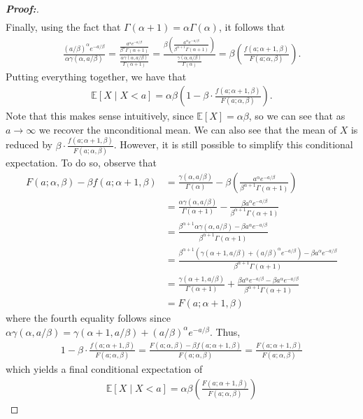 \documentclass[10pt,a4paper]{amsart}
\begin{document}
\begin{proof}[\textbf{Proof:}]
\begin{align*}
\end{align*}
Finally, using the fact that $\Gamma(\alpha + 1) = \alpha \Gamma(\alpha)$, it follows that
\begin{align*}
     \frac{(a / \beta)^\alpha e^{- a / \beta}}{\alpha \gamma(\alpha, a / \beta)} = \frac{\frac{a^\alpha e^{- a / \beta}}{\beta^\alpha \Gamma(\alpha + 1)} }{\frac{\alpha \gamma(\alpha, a / \beta)}{\Gamma(\alpha + 1)}} = \frac{\beta \left(\frac{a^\alpha e^{- a / \beta}}{\beta^{\alpha+1} \Gamma(\alpha + 1)} \right) }{\frac{\gamma(\alpha, a / \beta)}{\Gamma(\alpha)}} = \beta \left(\frac{f(a; \alpha + 1, \beta)}{F(a; \alpha, \beta)} \right).
\end{align*}
Putting everything together, we have that
\begin{align*}
    \mathbb{E}\left[X \mid X < a \right] = \alpha \beta \left(1 - \beta \cdot \frac{f(a; \alpha + 1, \beta)}{F(a; \alpha, \beta)}\right).
\end{align*}
Note that this makes sense intuitively, since $\mathbb{E}[X] = \alpha \beta$, so we can see that as $a \to \infty$ we recover the unconditional mean. We can also see that the mean of $X$ is reduced by $\beta \cdot \frac{f(a; \alpha + 1, \beta)}{F(a; \alpha, \beta)}$. However, it is still possible to simplify this conditional expectation. To do so, observe that
\begin{align*}
    F(a; \alpha, \beta) - \beta f(a ; \alpha + 1, \beta) &= \frac{\gamma(\alpha, a / \beta)}{\Gamma(\alpha)} - \beta \left(\frac{a^\alpha e^{- a / \beta}}{\beta^{\alpha+1} \Gamma(\alpha + 1)} \right) \\
    &= \frac{\alpha \gamma(\alpha, a / \beta)}{\Gamma(\alpha + 1)} - \frac{\beta a^\alpha e^{- a / \beta}}{\beta^{\alpha+1} \Gamma(\alpha + 1)} \\
    &= \frac{\beta^{\alpha + 1} \alpha \gamma(\alpha, a / \beta) - \beta a^\alpha e^{- a / \beta}}{\beta^{\alpha + 1}\Gamma(\alpha + 1)} \\
    &= \frac{\beta^{\alpha + 1} \left( \gamma(\alpha + 1, a / \beta) + (a / \beta)^\alpha e^{- a / \beta}\right) - \beta a^\alpha e^{- a / \beta}}{\beta^{\alpha + 1}\Gamma(\alpha + 1)} \\
    &= \frac{ \gamma(\alpha + 1, a / \beta)}{\Gamma(\alpha + 1)} + \frac{\beta a^\alpha e^{- a / \beta} - \beta a^\alpha e^{- a / \beta}}{\beta^{\alpha + 1}\Gamma(\alpha + 1)} \\
    &= F(a; \alpha + 1, \beta)
\end{align*}
where the fourth equality follows since $\alpha \gamma( \alpha, a / \beta) = \gamma(\alpha + 1, a / \beta) + (a / \beta)^\alpha e^{- a / \beta}$. Thus,
\begin{align*}
    1 - \beta \cdot \frac{f(a; \alpha + 1, \beta)}{F(a; \alpha, \beta)} = \frac{F(a; \alpha, \beta) - \beta f(a; \alpha + 1, \beta)}{F(a; \alpha, \beta)} = \frac{F(a; \alpha + 1, \beta)}{F(a; \alpha, \beta)}
\end{align*}
which yields a final conditional expectation of
\begin{align*}
    \mathbb{E}\left[X \mid X < a \right] = \alpha \beta \left(\frac{F(a; \alpha + 1, \beta)}{F(a; \alpha, \beta)}\right)
\end{align*}
\end{proof}
\end{document}
